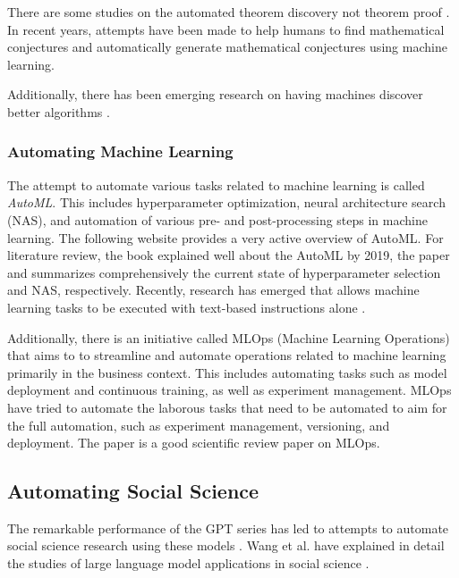 There are some studies on the automated theorem discovery not theorem proof \cite{gao2014systematic}. In recent years, attempts have been made to help humans to find mathematical conjectures \cite{davies2021advancing} and
automatically generate mathematical conjectures \cite{raayoni2021generating,mishra2023mathematical}  using machine learning.

Additionally, there has been emerging research on having machines discover better algorithms \cite{mankowitz2023faster,fawzi2022discovering}.

\subsubsection{Automating Machine Learning}
The attempt to automate various tasks related to machine learning is called \textit{AutoML}. This includes hyperparameter optimization, neural architecture search (NAS), and automation of various pre- and post-processing steps in machine learning. The following website \cite{automlorg} provides a very active overview of AutoML. For literature review, the book \cite{hutter2019automated} explained well about the AutoML by 2019, the paper \cite{bischl2023hyperparameter} and \cite{lindauer2020best,white2023neural} summarizes comprehensively the current state of hyperparameter selection and NAS, respectively. Recently, research has emerged that allows machine learning tasks to be executed with text-based instructions alone \cite{vijay2023prompt}.

Additionally, there is an initiative called MLOps (Machine Learning Operations) that aims to to streamline and automate operations related to machine learning primarily in the business context. This includes automating tasks such as model deployment and continuous training, as well as experiment management. MLOps have tried to automate the laborous tasks that need to be automated to aim for the full automation, such as experiment management, versioning, and deployment. The paper \cite{kreuzberger2023machine} is a good scientific review paper on MLOps.

\cite{zheng2023can}

\subsection{Automating Social Science}

The remarkable performance of the GPT series has led to attempts to automate social science research using these models \cite{bail2023can,ziems2023can,park2023generative}. Wang et al. have explained in detail the studies of large language model applications in social science \cite{wang2023survey}.

